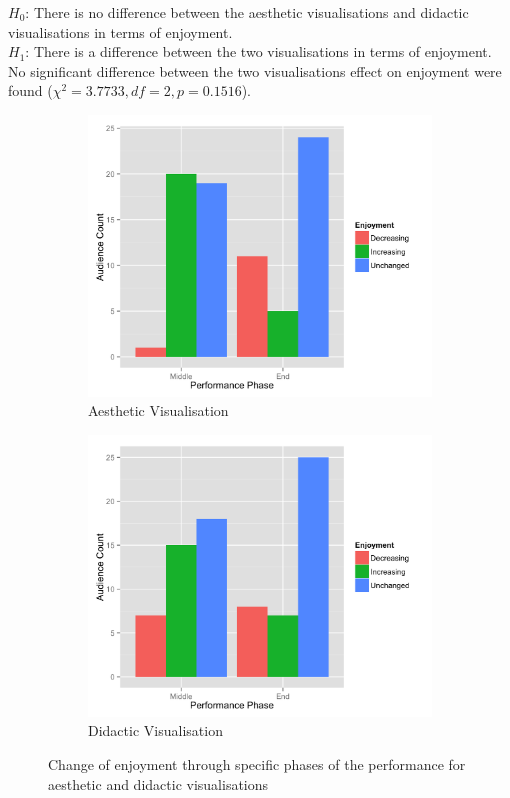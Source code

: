 \documentclass{article}
\begin{document}
$H_0$: There is no difference between the aesthetic visualisations and didactic visualisations in terms of enjoyment.\\
$H_1$: There is a difference between the two visualisations in terms of enjoyment.\\

No significant difference between the two visualisations effect on enjoyment were found ($\chi^2=3.7733,df=2,p=0.1516$).

\begin{figure}[t]
\centering
\begin{subfigure}{.5\textwidth}
    \centering
    \includegraphics[width=1.0\linewidth]{graphs/enjoyment-change-aesthetic.png}
    \caption{Aesthetic Visualisation}
    \label{aestheticenjoymentchange}
\end{subfigure}%
\begin{subfigure}{.5\textwidth}
    \centering
    \includegraphics[width=1.0\linewidth]{graphs/enjoyment-change-didactic.png}
    \caption{Didactic Visualisation}
    \label{didacticenjoymentchange}
\end{subfigure}
\caption{Change of enjoyment through specific phases of the performance for aesthetic and didactic visualisations}
\end{figure}
\end{document}
